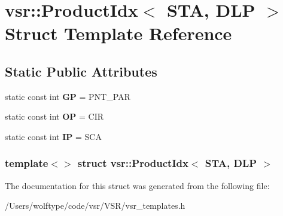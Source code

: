 \hypertarget{structvsr_1_1_product_idx_3_01_s_t_a_00_01_d_l_p_01_4}{\section{vsr\-:\-:Product\-Idx$<$ S\-T\-A, D\-L\-P $>$ Struct Template Reference}
\label{structvsr_1_1_product_idx_3_01_s_t_a_00_01_d_l_p_01_4}
}
\subsection*{Static Public Attributes}
\begin{DoxyCompactItemize}
\item 
\hypertarget{structvsr_1_1_product_idx_3_01_s_t_a_00_01_d_l_p_01_4_afd3113d24ab6f87ce85539868a79c926}{static const int {\bfseries G\-P} = P\-N\-T\-\_\-\-P\-A\-R}\label{structvsr_1_1_product_idx_3_01_s_t_a_00_01_d_l_p_01_4_afd3113d24ab6f87ce85539868a79c926}

\item 
\hypertarget{structvsr_1_1_product_idx_3_01_s_t_a_00_01_d_l_p_01_4_adbb6baef7e839bd24332249e46b4b514}{static const int {\bfseries O\-P} = C\-I\-R}\label{structvsr_1_1_product_idx_3_01_s_t_a_00_01_d_l_p_01_4_adbb6baef7e839bd24332249e46b4b514}

\item 
\hypertarget{structvsr_1_1_product_idx_3_01_s_t_a_00_01_d_l_p_01_4_a8728ec10d9138f74aac919d791adf34f}{static const int {\bfseries I\-P} = S\-C\-A}\label{structvsr_1_1_product_idx_3_01_s_t_a_00_01_d_l_p_01_4_a8728ec10d9138f74aac919d791adf34f}

\end{DoxyCompactItemize}
\subsubsection*{template$<$$>$ struct vsr\-::\-Product\-Idx$<$ S\-T\-A, D\-L\-P $>$}



The documentation for this struct was generated from the following file\-:\begin{DoxyCompactItemize}
\item 
/\-Users/wolftype/code/vsr/\-V\-S\-R/vsr\-\_\-templates.\-h\end{DoxyCompactItemize}
